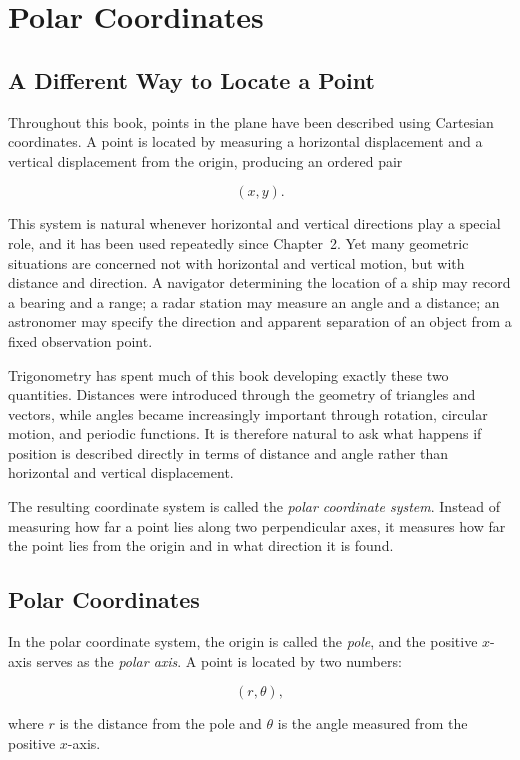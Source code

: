 \chapter{Polar Coordinates}
\label{ch:ch14-polar-coordinates}

\section{A Different Way to Locate a Point}

Throughout this book, points in the plane have been described using
Cartesian coordinates. A point is located by measuring a horizontal
displacement and a vertical displacement from the origin, producing an
ordered pair

\[
(x,y).
\]

This system is natural whenever horizontal and vertical directions play a
special role, and it has been used repeatedly since Chapter~2. Yet many
geometric situations are concerned not with horizontal and vertical
motion, but with distance and direction. A navigator determining the
location of a ship may record a bearing and a range; a radar station may
measure an angle and a distance; an astronomer may specify the direction
and apparent separation of an object from a fixed observation point.

Trigonometry has spent much of this book developing exactly these two
quantities. Distances were introduced through the geometry of triangles
and vectors, while angles became increasingly important through rotation,
circular motion, and periodic functions. It is therefore natural to ask
what happens if position is described directly in terms of distance and
angle rather than horizontal and vertical displacement.

The resulting coordinate system is called the \emph{polar coordinate
system}. Instead of measuring how far a point lies along two perpendicular
axes, it measures how far the point lies from the origin and in what
direction it is found.

\section{Polar Coordinates}

In the polar coordinate system, the origin is called the \emph{pole}, and
the positive $x$-axis serves as the \emph{polar axis}. A point is located
by two numbers:

\[
(r,\theta),
\]

where $r$ is the distance from the pole and $\theta$ is the angle measured
from the positive $x$-axis.

